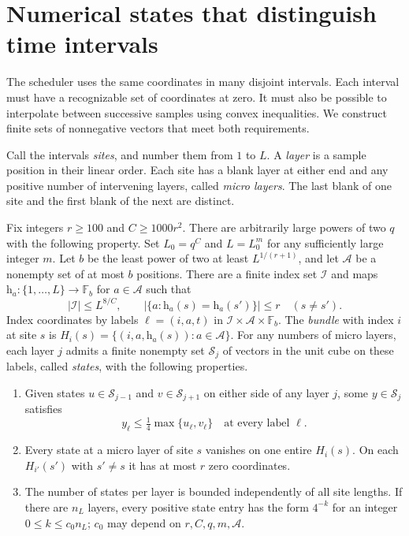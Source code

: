\section{Numerical states that distinguish time intervals}\label{sec:numerical}

The scheduler uses the same coordinates in many disjoint intervals.
Each interval must have a recognizable set of coordinates at zero. It
must also be possible to interpolate between successive samples using
convex inequalities. We construct finite sets of nonnegative vectors
that meet both requirements.

Call the intervals \emph{sites}, and number them from \(1\) to \(L\).
A \emph{layer} is a sample position in their linear order. Each site
has a blank layer at either end and any positive number of intervening
layers, called \emph{micro layers}. The last blank of one site and the
first blank of the next are distinct.

\begin{theorem}\label{thm:coarse}
Fix integers \(r\ge100\) and \(C\ge1000r^2\). There are arbitrarily
large powers of two \(q\) with the following property. Set \(L_0=q^C\)
and \(L=L_0^m\) for any sufficiently large integer \(m\). Let \(b\)
be the least power of two at least \(L^{1/(r+1)}\), and let
\(\mathcal A\) be a nonempty set of at most \(b\) positions.
There are a finite index set \(\mathcal I\) and maps
\(\mathrm h_a:\{1,\ldots,L\}\to\mathbb F_b\) for \(a\in\mathcal A\)
such that
\[
 |\mathcal I|\le L^{8/C},\qquad
 \big|\{a:\mathrm h_a(s)=\mathrm h_a(s')\}\big|\le r
 \quad(s\ne s').
\]
Index coordinates by labels \(\ell=(i,a,t)\) in
\(\mathcal I\times\mathcal A\times\mathbb F_b\). The \emph{bundle}
with index \(i\) at site \(s\) is
\(H_i(s)=\{(i,a,\mathrm h_a(s)):a\in\mathcal A\}\).
For any numbers of micro layers, each layer \(j\) admits a finite
nonempty set \(\mathcal S_j\) of vectors in the unit cube on these
labels, called \emph{states}, with the following properties.
\begin{enumerate}
\item Given states \(u\in\mathcal S_{j-1}\) and
\(v\in\mathcal S_{j+1}\) on either side of any layer \(j\), some
\(y\in\mathcal S_j\) satisfies
\begin{equation}\label{eq:layermerge}
                y_\ell\le\tfrac14\max\{u_\ell,v_\ell\}
                \quad\text{at every label }\ell .
\end{equation}
\item Every state at a micro layer of site \(s\) vanishes on one
entire \(H_i(s)\). On each \(H_{i'}(s')\) with \(s'\ne s\) it has
at most \(r\) zero coordinates.
\item The number of states per layer is bounded independently of all
site lengths. If there are \(n_L\) layers, every positive state entry
has the form \(4^{-k}\) for an integer \(0\le k\le c_0 n_L\);
\(c_0\) may depend on \(r,C,q,m,\mathcal A\).
\end{enumerate}
\end{theorem}

